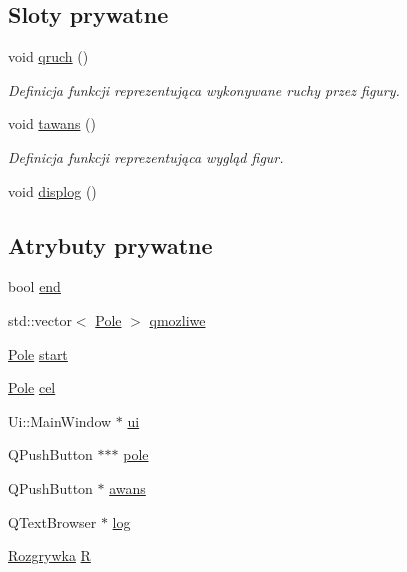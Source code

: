 \subsection*{\-Sloty prywatne}
\begin{DoxyCompactItemize}
\item 
void \hyperlink{class_main_window_ad3e1191b4be0b343cdb2e246c9d11249}{qruch} ()
\begin{DoxyCompactList}\small\item\em \-Definicja funkcji reprezentująca wykonywane ruchy przez figury. \end{DoxyCompactList}\item 
void \hyperlink{class_main_window_a4488c49a6f9427c44df99c10e2cbe17f}{tawans} ()
\begin{DoxyCompactList}\small\item\em \-Definicja funkcji reprezentująca wygląd figur. \end{DoxyCompactList}\item 
void \hyperlink{class_main_window_a71ddea5cf91abf6aab0fc21170b7baf3}{displog} ()
\end{DoxyCompactItemize}
\subsection*{\-Atrybuty prywatne}
\begin{DoxyCompactItemize}
\item 
bool \hyperlink{class_main_window_a24823a731fbd97181b314763bd491e50}{end}
\item 
std\-::vector$<$ \hyperlink{class_pole}{\-Pole} $>$ \hyperlink{class_main_window_a9081d2e6cde7089a308fd4c738d722dd}{qmozliwe}
\item 
\hyperlink{class_pole}{\-Pole} \hyperlink{class_main_window_aaaecb46583504233ea801b4ec34e9f29}{start}
\item 
\hyperlink{class_pole}{\-Pole} \hyperlink{class_main_window_a283ff2015ce02067caf95ef460be3ff9}{cel}
\item 
\-Ui\-::\-Main\-Window $\ast$ \hyperlink{class_main_window_a35466a70ed47252a0191168126a352a5}{ui}
\item 
\-Q\-Push\-Button $\ast$$\ast$$\ast$ \hyperlink{class_main_window_a9ef49c25c7693c691076e6b46b45db76}{pole}
\item 
\-Q\-Push\-Button $\ast$ \hyperlink{class_main_window_ade2329ceab4efd7401816607726fb57f}{awans}
\item 
\-Q\-Text\-Browser $\ast$ \hyperlink{class_main_window_aca8da845b050d554d5e6f335c6f143c7}{log}
\item 
\hyperlink{class_rozgrywka}{\-Rozgrywka} \hyperlink{class_main_window_a38c1321667bd8650828922d1c779b6ef}{\-R}
\end{DoxyCompactItemize}
